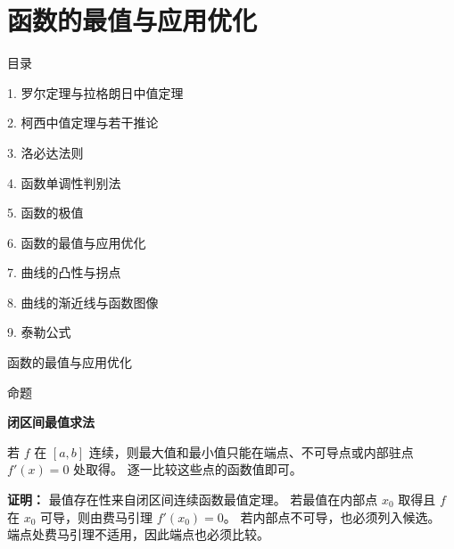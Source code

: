 \documentclass[aspectratio=169,10pt,fontset=fandol]{ctexbeamer}
\begin{document}
\section{函数的最值与应用优化}
\begin{frame}[t,fragile]{目录}
\normalsize
{\color{black}\normalsize 1. 罗尔定理与拉格朗日中值定理\par}\vspace{0.22em}
{\color{black}\normalsize 2. 柯西中值定理与若干推论\par}\vspace{0.22em}
{\color{black}\normalsize 3. 洛必达法则\par}\vspace{0.22em}
{\color{black}\normalsize 4. 函数单调性判别法\par}\vspace{0.22em}
{\color{black}\normalsize 5. 函数的极值\par}\vspace{0.22em}
{\color{blue}\normalsize 6. 函数的最值与应用优化\par}\vspace{0.22em}
{\color{gray!40}\normalsize 7. 曲线的凸性与拐点\par}\vspace{0.22em}
{\color{gray!40}\normalsize 8. 曲线的渐近线与函数图像\par}\vspace{0.22em}
{\color{gray!40}\normalsize 9. 泰勒公式\par}\vspace{0.22em}
\end{frame}
\begin{frame}[t,fragile]{函数的最值与应用优化}
\normalsize
\begin{block}{命题}
{\normalsize
\textbf{闭区间最值求法}\par

若 $f$ 在 $[a,b]$ 连续，则最大值和最小值只能在端点、不可导点或内部驻点 $f'(x)=0$ 处取得。 逐一比较这些点的函数值即可。

}
\end{block}
\pause
{\normalsize
\textbf{证明：}
最值存在性来自闭区间连续函数最值定理。 若最值在内部点 $x_0$ 取得且 $f$ 在 $x_0$ 可导，则由费马引理 $f'(x_0)=0$。 若内部点不可导，也必须列入候选。 端点处费马引理不适用，因此端点也必须比较。

}
\end{frame}
\end{document}
